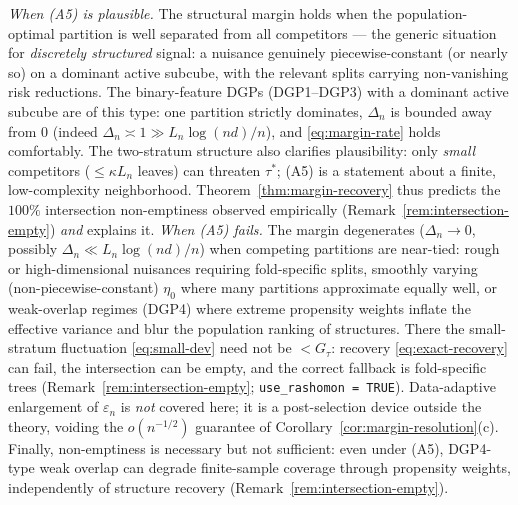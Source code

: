 \begin{remark}
\label{rem:margin-scope}
\emph{When (A5) is plausible.} The structural margin holds when the
population-optimal partition is well separated from all competitors --- the
generic situation for \emph{discretely structured} signal: a nuisance genuinely
piecewise-constant (or nearly so) on a dominant active subcube, with the relevant
splits carrying non-vanishing risk reductions. The binary-feature DGPs
(DGP1--DGP3) with a dominant active subcube are of this type: one partition
strictly dominates, $\Delta_n$ is bounded away from $0$ (indeed $\Delta_n\asymp
1\gg L_n\log(nd)/n$), and \eqref{eq:margin-rate} holds comfortably. The two-stratum
structure also clarifies plausibility: only \emph{small} competitors ($\le\kappa
L_n$ leaves) can threaten $\tau^\ast$; (A5) is a statement about a finite,
low-complexity neighborhood. Theorem~\ref{thm:margin-recovery} thus predicts the
$100\%$ intersection non-emptiness observed empirically
(Remark~\ref{rem:intersection-empty}) \emph{and} explains it.
\emph{When (A5) fails.} The margin degenerates ($\Delta_n\to0$, possibly
$\Delta_n\ll L_n\log(nd)/n$) when competing partitions are near-tied: rough or
high-dimensional nuisances requiring fold-specific splits, smoothly varying
(non-piecewise-constant) $\eta_0$ where many partitions approximate equally well,
or weak-overlap regimes (DGP4) where extreme propensity weights inflate the
effective variance and blur the population ranking of structures. There the
small-stratum fluctuation \eqref{eq:small-dev} need not be $<G_\tau$: recovery
\eqref{eq:exact-recovery} can fail, the intersection can be empty, and the
correct fallback is fold-specific trees (Remark~\ref{rem:intersection-empty};
\texttt{use\_rashomon = TRUE}). Data-adaptive enlargement of $\varepsilon_n$ is
\emph{not} covered here; it is a post-selection device outside the theory, voiding
the $o(n^{-1/2})$ guarantee of Corollary~\ref{cor:margin-resolution}(c). Finally,
non-emptiness is necessary but not sufficient: even under (A5), DGP4-type weak
overlap can degrade finite-sample coverage through propensity weights,
independently of structure recovery (Remark~\ref{rem:intersection-empty}).
\end{remark}

